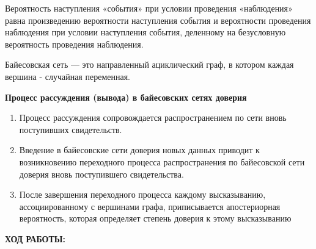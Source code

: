 \documentclass[14pt,a4paper]{extreport}
\newcommand{\header}[1]{%
{
\clearpage%
\fontsize{16pt}{14pt}\selectfont
\begin{center}
\textbf{\MakeUppercase{#1}:}
\end{center}
}
}
\begin{document}
Вероятность наступления «события» при условии проведения «наблюдения» равна произведению вероятности наступления события и вероятности проведения наблюдения при условии наступления события, деленному на безусловную вероятность проведения наблюдения.

\par

Байесовская сеть — это направленный ациклический граф, в котором каждая вершина - случайная переменная.

\par

\begin{center}
\textbf{Процесс рассуждения (вывода) в байесовских сетях доверия}
\end{center}

\begin{enumerate}

\item Процесс рассуждения сопровождается распространением по сети вновь поступивших свидетельств. 

\item Введение в байесовские сети доверия новых данных приводит к возникновению переходного процесса распространения по байесовской сети доверия вновь поступившего свидетельства. 

\item После завершения переходного процесса каждому высказыванию, ассоциированному с вершинами графа, приписывается апостериорная вероятность, которая определяет степень доверия к этому высказыванию 

\end{enumerate}

\header{Ход работы}
\end{document}
